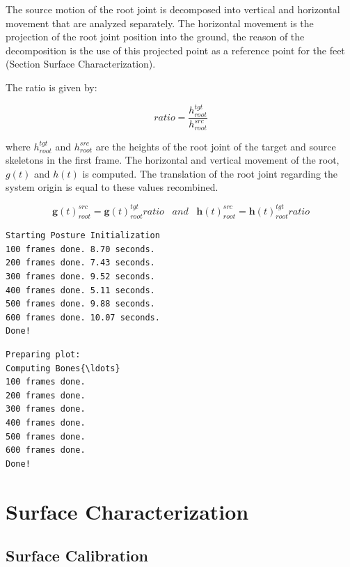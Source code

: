 \documentclass{vgtc}
\begin{document}
The source motion of the root joint is decomposed into vertical and
horizontal movement that are analyzed separately. The horizontal
movement is the projection of the root joint position into the ground,
the reason of the decomposition is the use of this projected point as a
reference point for the feet (Section Surface Characterization).

The ratio is given by:

\begin{equation}
    \label{eq:heightratio}
    ratio = \frac{h_{root}^{tgt}}{h_{root}^{src}}
    \end{equation}

where \(h_{root}^{tgt}\) and \(h_{root}^{src}\) are the heights of the
root joint of the target and source skeletons in the first frame. The
horizontal and vertical movement of the root, \(g(t)\) and \(h(t)\) is
computed. The translation of the root joint regarding the system origin
is equal to these values recombined.

\begin{equation}
    \label{eq:rootmov}
    \mathbf{g}(t)_{root}^{src} = \mathbf{g}(t)_{root}^{tgt} ratio \hspace{10pt} and \hspace{10pt}
    \mathbf{h}(t)_{root}^{src} = \mathbf{h}(t)_{root}^{tgt} ratio
    \end{equation}


    \begin{Verbatim}[commandchars=\\\{\}]
Starting Posture Initialization
100 frames done. 8.70 seconds.
200 frames done. 7.43 seconds.
300 frames done. 9.52 seconds.
400 frames done. 5.11 seconds.
500 frames done. 9.88 seconds.
600 frames done. 10.07 seconds.
Done!
\end{Verbatim}


    \begin{Verbatim}[commandchars=\\\{\}]
Preparing plot:
Computing Bones{\ldots}
100 frames done.
200 frames done.
300 frames done.
400 frames done.
500 frames done.
600 frames done.
Done!
\end{Verbatim}

    \hypertarget{surface-characterization}{%
\section{Surface Characterization}\label{surface-characterization}}

\hypertarget{surface-calibration}{%
\subsection{Surface Calibration}\label{surface-calibration}}
\end{document}
